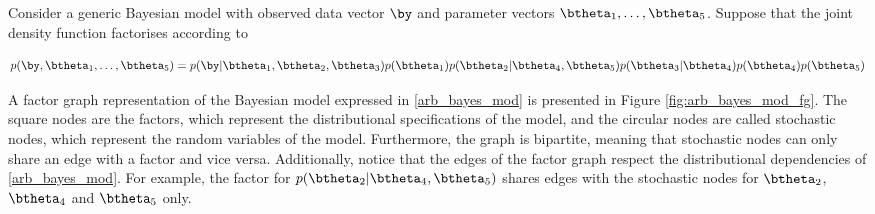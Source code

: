 \documentclass[12pt]{article}
\theoremstyle{plain}
\theoremstyle{definition}
\theoremstyle{remark}
\begin{document}
Consider a generic Bayesian model with observed data vector $\by$ and parameter vectors $\btheta_1, \dots,
\btheta_5$. Suppose that the joint density function factorises according to

\begin{equation}
	p (\by, \btheta_1, \dots, \btheta_5) =
		p (\by | \btheta_1, \btheta_2, \btheta_3) p (\btheta_1) p (\btheta_2 | \btheta_4, \btheta_5)
		p (\btheta_3 | \btheta_4) p (\btheta_4) p (\btheta_5)
\label{arb_bayes_mod}
\end{equation}

\noindent A factor graph representation of the Bayesian model expressed in \eqref{arb_bayes_mod} is presented
in Figure \ref{fig:arb_bayes_mod_fg}. The square nodes are the factors, which represent the distributional
specifications of the model, and the circular nodes are called stochastic nodes, which represent the random
variables of the model. Furthermore, the graph is bipartite, meaning that stochastic nodes can only share an
edge with a factor and vice versa. Additionally, notice that the edges of the factor graph respect the distributional
dependencies of \eqref{arb_bayes_mod}. For example, the factor for $p (\btheta_2 | \btheta_4, \btheta_5)$
shares edges with the stochastic nodes for $\btheta_2$, $\btheta_4$ and $\btheta_5$ only.
\end{document}
